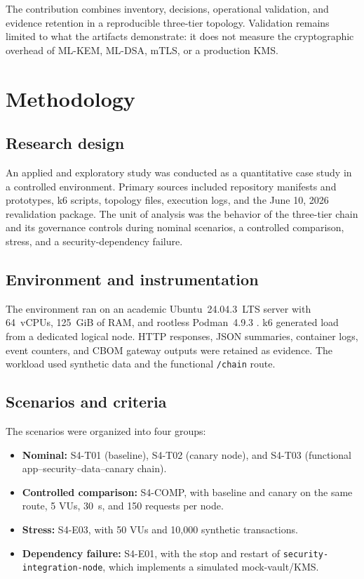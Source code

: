 \documentclass[12pt]{article}
\begin{document}
The contribution combines inventory, decisions, operational validation, and evidence retention in a reproducible three-tier topology. Validation remains limited to what the artifacts demonstrate: it does not measure the cryptographic overhead of ML-KEM, ML-DSA, mTLS, or a production KMS.

\section{Methodology}
\subsection{Research design}
An applied and exploratory study was conducted as a quantitative case study in a controlled environment. Primary sources included repository manifests and prototypes, k6 scripts, topology files, execution logs, and the June 10, 2026 revalidation package. The unit of analysis was the behavior of the three-tier chain and its governance controls during nominal scenarios, a controlled comparison, stress, and a security-dependency failure.

\subsection{Environment and instrumentation}
The environment ran on an academic Ubuntu~24.04.3~LTS server with 64~vCPUs, 125~GiB of RAM, and rootless Podman~4.9.3 \cite{podman}. k6 generated load from a dedicated logical node. HTTP responses, JSON summaries, container logs, event counters, and CBOM gateway outputs were retained as evidence. The workload used synthetic data and the functional \texttt{/chain} route.

\subsection{Scenarios and criteria}
The scenarios were organized into four groups:
\begin{itemize}
\item \textbf{Nominal:} S4-T01 (baseline), S4-T02 (canary node), and S4-T03 (functional app--security--data--canary chain).
\item \textbf{Controlled comparison:} S4-COMP, with baseline and canary on the same route, 5 VUs, 30~s, and 150 requests per node.
\item \textbf{Stress:} S4-E03, with 50 VUs and 10,000 synthetic transactions.
\item \textbf{Dependency failure:} S4-E01, with the stop and restart of \texttt{security-integration-node}, which implements a simulated mock-vault/KMS.
\end{itemize}
\end{document}
